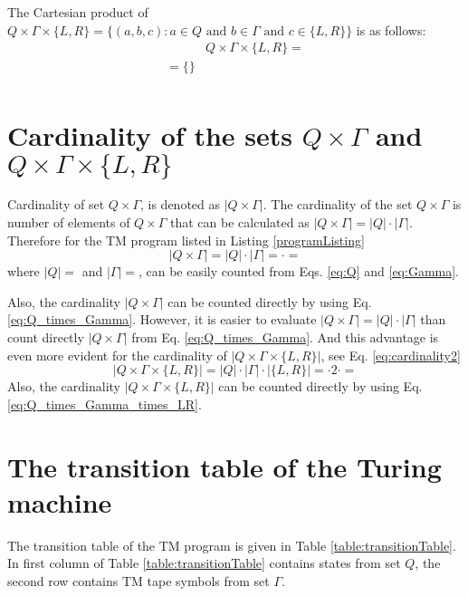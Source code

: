 \documentclass[12pt, a4paper]{report}
\begin{document}
{	The Cartesian product of $ Q \times \Gamma \times \{L,R\} = \{(a, b, c) : a \in Q \text{~and~} b \in \Gamma \text{~and~} c \in \{L,R\} \}$ is as follows:
		\begin{equation}\label{eq:Q_times_Gamma_times_LR}
		\begin{aligned}
		& Q \times \Gamma \times \{L,R\} = \\
		= \{
			\}      \\
		\end{aligned}
		\end{equation}

	\section{Cardinality of the sets $ Q \times \Gamma$ and $ Q \times \Gamma \times \{L, R\} $}
	Cardinality of set $ Q \times \Gamma $, is denoted as $ |Q \times \Gamma| $. The cardinality of the set $ Q \times \Gamma $ is number of elements of $ Q \times \Gamma $ that can be calculated as $ |Q \times \Gamma| = |Q| \cdot |\Gamma| $. Therefore for the TM program listed in Listing \ref{programListing}
	\begin{equation}\label{eq:cardinality2}
		|Q \times \Gamma| = |Q| \cdot |\Gamma| = %
		\cdot
		=
	\end{equation}
	where $ |Q| = %
	$ and $ |\Gamma| = %
	$, can be easily counted from Eqs. \eqref{eq:Q} and \eqref{eq:Gamma}.
	
	Also, the cardinality $ |Q \times \Gamma| $ can be counted directly by using Eq. \eqref{eq:Q_times_Gamma}. However, it is easier to evaluate $ {|Q \times \Gamma| = {|Q|}\cdot|\Gamma|}$ than count directly $ |Q \times \Gamma| $ from Eq. \eqref{eq:Q_times_Gamma}. And this  advantage is even more evident for the cardinality of $ |Q \times \Gamma \times \{L, R\}| $, see Eq. \eqref{eq:cardinality2}
	\begin{equation}\label{eq:cardinality2}
		|Q \times \Gamma \times \{L, R\}| = |Q| \cdot |\Gamma| \cdot |\{L, R\}| = %
		\cdot 2 \cdot %
		= %
	\end{equation}
	Also, the cardinality $ |Q \times \Gamma \times \{L, R\}| $ can be counted directly by using Eq. \eqref{eq:Q_times_Gamma_times_LR}.
	
	\newpage
	\section{The transition table of the Turing machine}
	The transition table of the TM program is given in Table \ref{table:transitionTable}. In first column of Table \ref{table:transitionTable} contains states from set $ Q $, the second row contains TM tape symbols from set $ \Gamma $.


}
\end{document}
